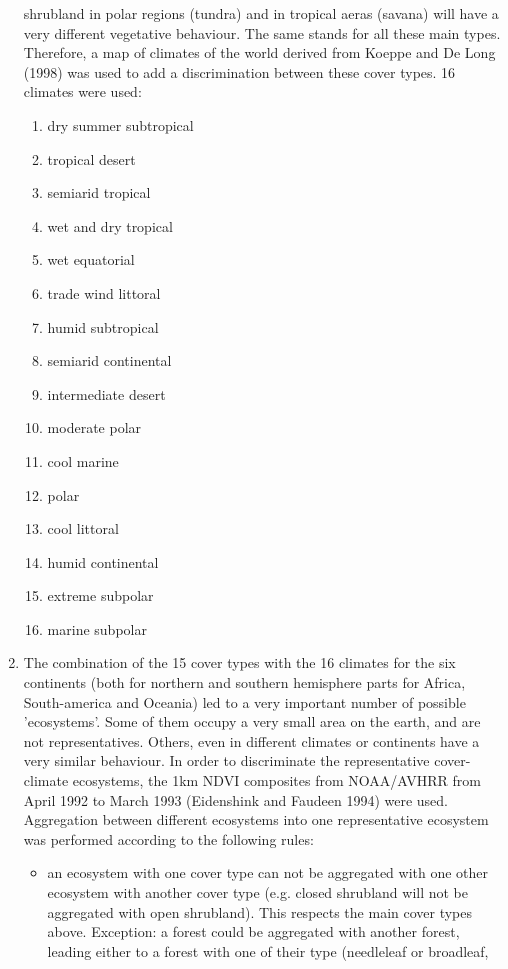 \begin{enumerate}
shrubland in polar regions (tundra) and in tropical aeras (savana)
will have a very different vegetative behaviour. The same stands
for all these main types. Therefore,
a map of climates of the world derived from Koeppe and De Long (1998)
was used to add a discrimination between these cover types. 16 climates
were used:
\begin{enumerate}
\item dry summer subtropical
\item tropical desert
\item semiarid tropical
\item wet and dry tropical
\item wet equatorial
\item trade wind littoral
\item humid subtropical
\item semiarid continental
\item intermediate desert
\item moderate polar
\item cool marine
\item polar
\item cool littoral
\item humid continental
\item extreme subpolar
\item marine subpolar
\end{enumerate}
\item The combination of the 15 cover types with the 16 climates
for the six continents (both for northern and southern hemisphere parts for
Africa, South-america and Oceania) led to a very important number
of possible 'ecosystems'. Some of them occupy a very small area
on the earth, and are not representatives. Others, even in different
climates or continents have a very similar behaviour. In order to
discriminate the representative cover-climate ecosystems,
the 1km NDVI composites from NOAA/AVHRR from April 1992 to March 1993
(Eidenshink and Faudeen 1994) were used.
Aggregation between different ecosystems into one representative ecosystem
was performed according to the following rules:
\begin{itemize}
\item an ecosystem with one cover type can not be aggregated with one
other ecosystem with another cover type (e.g. closed shrubland will not be
aggregated with open shrubland). This respects the main cover types above.
Exception: a forest could be aggregated with another forest, leading
either to a forest with one of their type (needleleaf or broadleaf,

\end{itemize}
\end{enumerate}
